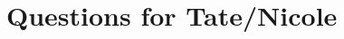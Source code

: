 \documentclass[10pt]{article} %
\begin{document}

\section{Questions for Tate/Nicole}
\end{document}
